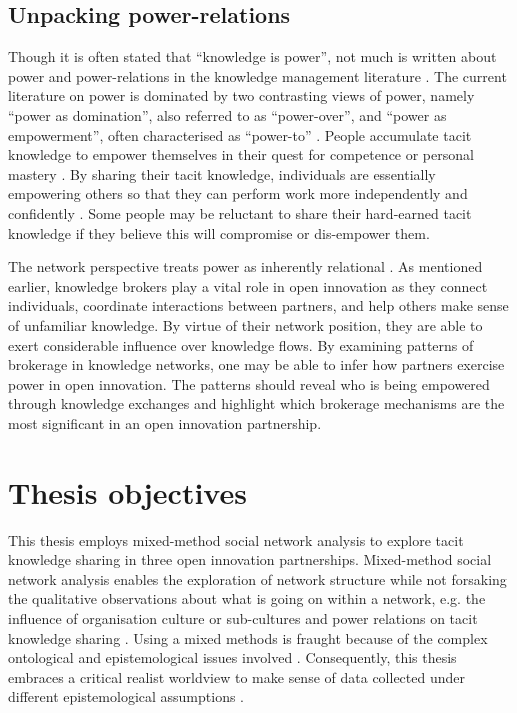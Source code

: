 \subsection{Unpacking power-relations} 

Though it is often stated that \enquote{knowledge is power}, not much is written about power and power-relations in the knowledge management literature \citep{haugaard2012rethinking}. The current literature on power is dominated by two contrasting views of power, namely \enquote{power as domination}, also referred to as \enquote{power-over}, and \enquote{power as empowerment}, often characterised as \enquote{power-to} \citep{haugaard2012rethinking}.  People accumulate tacit knowledge to empower themselves in their quest for competence or personal mastery \citep{endres2007tacit}. By sharing their tacit knowledge, individuals are essentially empowering others so that they can perform work more independently and confidently \citep{bordum2002tacit,lin2007share}. Some people may be reluctant to share their hard-earned tacit knowledge if they believe this will compromise or dis-empower them. \medskip

The network perspective treats power as inherently relational \citep{ibarra1993power}. As mentioned earlier, knowledge brokers play a vital role in open innovation as they connect individuals, coordinate interactions between partners, and help others make sense of unfamiliar knowledge. By virtue of their network position, they are able to exert considerable influence over knowledge flows. By examining patterns of brokerage in knowledge networks, one may be able to infer how partners exercise power in open innovation. The patterns should reveal who is being empowered through knowledge exchanges and highlight which brokerage mechanisms are the most significant in an open innovation partnership. 

\section{Thesis objectives}

This thesis employs mixed-method social network analysis to explore tacit knowledge sharing in three open innovation partnerships. Mixed-method social network analysis enables the exploration of network structure while not forsaking the qualitative observations about what is going on within a network, e.g. the influence of organisation culture or sub-cultures and power relations on tacit knowledge sharing \citep{crossley2010social}. Using a mixed methods is fraught because of the complex ontological and epistemological issues involved \citep{giddings2006mixed,mcevoy2006critical}. Consequently, this thesis embraces a critical realist worldview to make sense of data collected under different epistemological assumptions \citep{johnson2004mixed,giddings2006mixed}. \medskip

